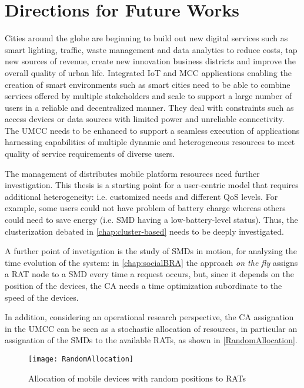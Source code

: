 \documentclass[twoside,openright]{report}
\begin{document}
\section{Directions for Future Works}
Cities around the globe are beginning to build out new digital services such as smart lighting, traffic, waste management and data analytics to reduce costs, tap new sources of revenue, create new innovation business districts and improve the overall quality of urban life. 
Integrated \gls{IoT} and \gls{MCC} applications enabling the creation of smart environments such as smart cities need to be able to combine services offered by multiple stakeholders and scale to support a large number of users in a reliable and decentralized manner. 
They deal with constraints such as access devices or data sources with limited power and unreliable connectivity. 
The \gls{UMCC} needs to be enhanced to support a seamless execution of applications harnessing capabilities of multiple dynamic and heterogeneous resources to meet quality
of service requirements of diverse users.

The management of distributes mobile platform resources need further investigation. This thesis is a starting point for a user-centric model that requires additional heterogeneity: i.e. customized needs and different \gls{QoS} levels. For example, some users could not have problem of battery charge whereas others could need to save energy (i.e. \gls{SMD} having a low-battery-level status). Thus, the clusterization debated in \autoref{chap:cluster-based} needs to be deeply investigated.  

A further point of invetigation is the study of \glspl{SMD} in motion, for analyzing the time evolution of the system: in \autoref{chap:socialBRA} the approach \emph{on the fly} assigns a \gls{RAT} node to a \gls{SMD} every time a request occurs, but, since it depends on the position of the devices, the \gls{CA} needs a time optimization subordinate to the speed of the devices.

In addition, considering an operational research perspective, the \gls{CA} assignation in the \gls{UMCC} can be seen as a stochastic allocation of resources, in particular an assignation of the \glspl{SMD} to the available \glspl{RAT}, as shown in \autoref{RandomAllocation}. 

\begin{figure}[htbp]
\centering
\texttt{[image: RandomAllocation]}
\caption{Allocation of mobile devices with random positions to RATs}
\label{RandomAllocation}
\end{figure}
\end{document}
